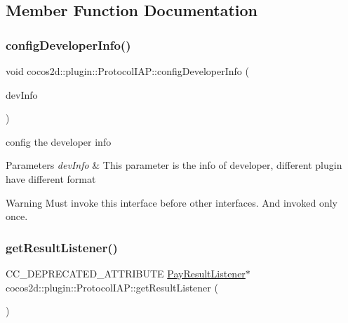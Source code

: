 \subsection{Member Function Documentation}
\mbox{\label{classcocos2d_1_1plugin_1_1ProtocolIAP_a0432aee3e56133c07dc99c33d9ae362b}} 
\subsubsection{\texorpdfstring{config\+Developer\+Info()}{configDeveloperInfo()}}
{\footnotesize\ttfamily void cocos2d\+::plugin\+::\+Protocol\+I\+A\+P\+::config\+Developer\+Info (\begin{DoxyParamCaption}\item[{T\+I\+A\+P\+Developer\+Info}]{dev\+Info }\end{DoxyParamCaption})}



config the developer info 


\begin{DoxyParams}{Parameters}
{\em dev\+Info} & This parameter is the info of developer, different plugin have different format \\
\hline
\end{DoxyParams}
\begin{DoxyWarning}{Warning}
Must invoke this interface before other interfaces. And invoked only once. 
\end{DoxyWarning}
\mbox{\label{classcocos2d_1_1plugin_1_1ProtocolIAP_ab6984d5cfdbe3b7f5c1a0797ee8e086b}} 
\subsubsection{\texorpdfstring{get\+Result\+Listener()}{getResultListener()}}
{\footnotesize\ttfamily C\+C\+\_\+\+D\+E\+P\+R\+E\+C\+A\+T\+E\+D\+\_\+\+A\+T\+T\+R\+I\+B\+U\+TE \hyperlink{classcocos2d_1_1plugin_1_1PayResultListener}{Pay\+Result\+Listener}$\ast$ cocos2d\+::plugin\+::\+Protocol\+I\+A\+P\+::get\+Result\+Listener (\begin{DoxyParamCaption}{ }\end{DoxyParamCaption})\hspace{0.3cm}{\ttfamily [inline]}}

